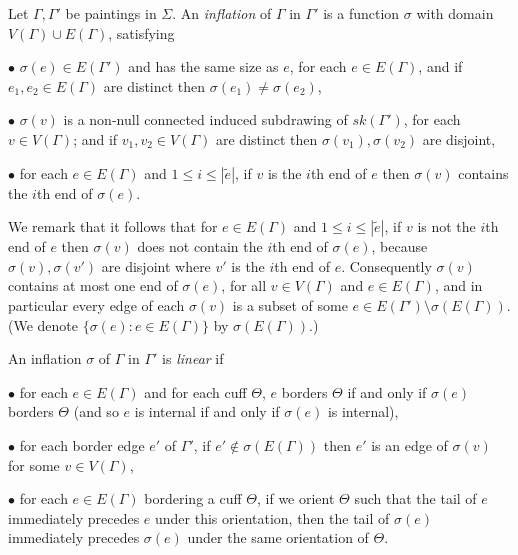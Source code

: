 Let $\Gamma, \Gamma'$ be paintings in $\Sigma$. An \textit{inflation} of $\Gamma$ in $\Gamma'$ is a function $\sigma$ with domain $V(\Gamma) \cup E(\Gamma)$, satisfying

\hspace*{12pt}$\bullet$ $\sigma(e) \in E(\Gamma')$ and has the same size as $e$, for each $e \in E(\Gamma)$, and if $e_1, e_2 \in E(\Gamma)$ are distinct then $\sigma(e_1) \ne \sigma(e_2)$,

\hspace*{12pt}$\bullet$ $\sigma(v)$ is a non-null connected induced subdrawing of $sk(\Gamma')$, for each $v \in V(\Gamma)$; and if $v_1, v_2 \in V(\Gamma)$ are distinct then $\sigma(v_1), \sigma(v_2)$ are disjoint,

\hspace*{12pt}$\bullet$ for each $e \in E(\Gamma)$ and $1 \le i \le |\tilde{e}|$, if $v$ is the $i$th end of $e$ then $\sigma(v)$ contains the $i$th end of $\sigma(e)$.

We remark that it follows that for $e \in E(\Gamma)$ and $1 \le i \le |\tilde{e}|$, if $v$ is not the $i$th end of $e$ then $\sigma(v)$ does not contain the $i$th end of $\sigma(e)$, because $\sigma(v), \sigma(v')$ are disjoint where $v'$ is the $i$th end of $e$. Consequently $\sigma(v)$ contains at most one end of $\sigma(e)$, for all $v \in V(\Gamma)$ and $e \in E(\Gamma)$, and in particular every edge of each $\sigma(v)$ is a subset of some $e \in E(\Gamma') \setminus \sigma(E(\Gamma))$. (We denote $\{\sigma(e) : e \in E(\Gamma)\}$ by $\sigma(E(\Gamma))$.)

An inflation $\sigma$ of $\Gamma$ in $\Gamma'$ is \textit{linear} if

\hspace*{12pt}$\bullet$ for each $e \in E(\Gamma)$ and for each cuff $\Theta$, $e$ borders $\Theta$ if and only if $\sigma(e)$ borders $\Theta$ (and so $e$ is internal if and only if $\sigma(e)$ is internal),

\hspace*{12pt}$\bullet$ for each border edge $e'$ of $\Gamma'$, if $e' \notin \sigma(E(\Gamma))$ then $e'$ is an edge of $\sigma(v)$ for some $v \in V(\Gamma)$,

\hspace*{12pt}$\bullet$ for each $e \in E(\Gamma)$ bordering a cuff $\Theta$, if we orient $\Theta$ such that the tail of $e$ immediately precedes $e$ under this orientation, then the tail of $\sigma(e)$ immediately precedes $\sigma(e)$ under the same orientation of $\Theta$.


